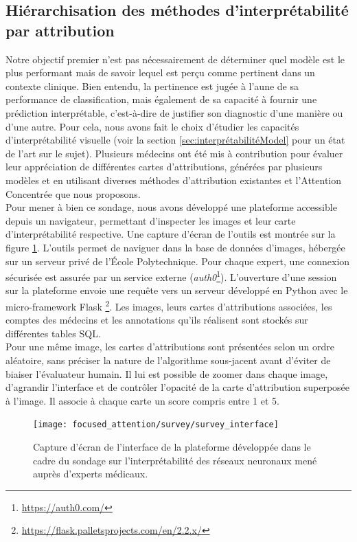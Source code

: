 \subsection{Hiérarchisation des méthodes d'interprétabilité par attribution}
Notre objectif premier n'est pas nécessairement de déterminer quel modèle est le plus performant mais de savoir lequel est perçu comme pertinent dans un contexte clinique. Bien entendu, la pertinence est jugée à l'aune de sa performance de classification, mais également de sa capacité à fournir une prédiction interprétable, c'est-à-dire de justifier son diagnostic d'une manière ou d'une autre. Pour cela, nous avons fait le choix d'étudier les capacités d'interprétabilité visuelle (voir la section \ref{sec:interprétabilitéModel} pour un état de l'art sur le sujet). Plusieurs médecins ont été mis à contribution pour évaluer leur appréciation de différentes cartes d'attributions, générées par plusieurs modèles et en utilisant diverses méthodes d'attribution existantes et l'Attention Concentrée que nous proposons. 
\\
Pour mener à bien ce sondage, nous avons développé une plateforme accessible depuis un navigateur, permettant d'inspecter les images et leur carte d'interprétabilité respective. Une capture d'écran de l'outils est montrée sur la figure \ref{fig:surveyinterface}. L'outils permet de naviguer dans la base de données d'images, hébergée sur un serveur privé de l'École Polytechnique. Pour chaque expert, une connexion sécurisée est assurée par un service externe (\textit{auth0}\footnote{\url{https://auth0.com/}}). L'ouverture d'une session sur la plateforme envoie une requête vers un serveur développé en Python avec le micro-framework Flask \footnote{\url{https://flask.palletsprojects.com/en/2.2.x/}}. Les images, leurs cartes d'attributions associées, les comptes des médecins et les annotations qu'ils réalisent sont stockés sur différentes tables SQL. 
\\ 
Pour une même image, les cartes d'attributions sont présentées selon un ordre aléatoire, sans préciser la nature de l'algorithme sous-jacent avant d'éviter de biaiser l'évaluateur humain. Il lui est possible de zoomer dans chaque image, d'agrandir l'interface et de contrôler l'opacité de la carte d'attribution superposée à l'image. Il associe à chaque carte un score compris entre 1 et 5.
\begin{figure}
	\centering
	\texttt{[image: focused\_attention/survey/survey\_interface]}
	\caption{Capture d'écran de l'interface de la plateforme développée dans le cadre du sondage sur l'interprétabilité des réseaux neuronaux mené auprès d'experts médicaux.}
	\label{fig:surveyinterface}
\end{figure}

